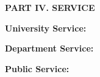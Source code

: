 \documentclass[10pt]{article}
\begin{document}

\vspace{0.5cm}
\textbf{PART IV.  SERVICE}

\vspace{0.5cm}
\textbf{University Service:}
\vspace{0.2cm}


\vspace{0.5cm}
\textbf{Department Service:}
\vspace{0.2cm}


\vspace{0.5cm}
\textbf{Public Service:}
\vspace{0.2cm}

\end{document}
